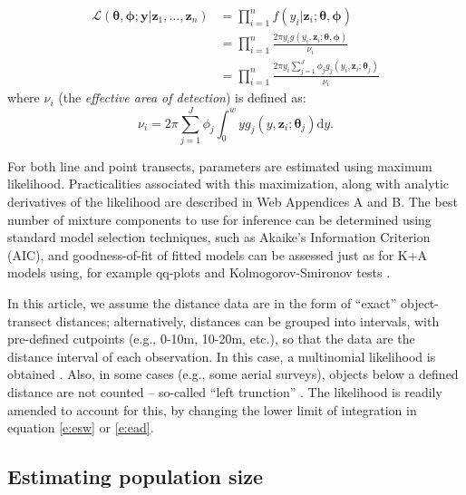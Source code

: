 \documentclass[useAMS,referee,usenatbib]{biom}
\begin{document}
\begin{align*}
\mathcal{L}(\bm{\theta},\bm{\phi}; \mathbf{y}  \vert \bm{z}_1, \ldots, \bm{z}_n) &= \prod_{i=1}^n f(y_i \vert \bm{z}_i; \bm{\theta},\bm{\phi})\\
&= \prod_{i=1}^n \frac{2 \pi y_i g(y_i,\bm{z}_i; \bm{\theta},\bm{\phi})}{\nu_i}\\
&= \prod_{i=1}^n \frac{2 \pi y_i \sum_{j=1}^J \phi_j g_j(y_i,\bm{z}_i; \bm{\theta}_j)}{\nu_i}
\end{align*}
where $\nu_i$ (the \textit{effective area of detection}) is defined as:
\begin{equation}
\label{e:ead}
\nu_i = 2\pi \sum_{j=1}^J \phi_j \int_0^w  y g_j(y,\bm{z}_i; \bm{\theta}_j) \text{d}y.
\end{equation}

For both line and point transects, parameters are estimated using maximum likelihood. Practicalities associated with this maximization, along with analytic derivatives of the likelihood are described in Web Appendices A and B.  The best number of mixture components to use for inference can be determined using standard model selection techniques, such as Akaike's Information Criterion (AIC), and goodness-of-fit of fitted models can be assessed just as for K+A models using, for example qq-plots and Kolmogorov-Smironov tests \citep[see][Section 11.11]{Buckland:2004ts}.

In this article, we assume the distance data are in the form of ``exact'' object-transect distances; alternatively, distances can be grouped into intervals, with pre-defined cutpoints (e.g., 0-10m, 10-20m, etc.), so that the data are the distance interval of each observation.  In this case, a multinomial likelihood is obtained \citep[see, e.g.][Section 3.3.2]{Buckland:2001vm}.  Also, in some cases (e.g., some aerial surveys), objects below a defined distance are not counted -- so-called ``left trunction'' \citep[][Section 4.3.2]{Buckland:2001vm}.  The likelihood is readily amended to account for this, by changing the lower limit of integration in equation \eqref{e:esw} or \eqref{e:ead}.

\subsection{Estimating population size}
\label{s:popsize}
\end{document}
